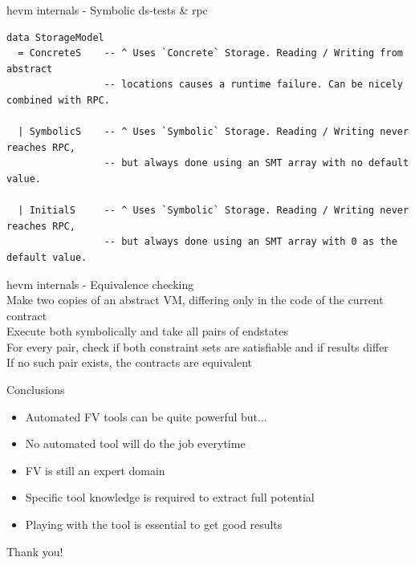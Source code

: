 \documentclass[aspectratio=169,10pt]{beamer}
\begin{document}
\begin{frame}[fragile]
\begin{center}
hevm internals - Symbolic ds-tests & rpc
\;\\
\begin{verbatim}
data StorageModel
  = ConcreteS    -- ^ Uses `Concrete` Storage. Reading / Writing from abstract
                 -- locations causes a runtime failure. Can be nicely combined with RPC.

  | SymbolicS    -- ^ Uses `Symbolic` Storage. Reading / Writing never reaches RPC,
                 -- but always done using an SMT array with no default value.

  | InitialS     -- ^ Uses `Symbolic` Storage. Reading / Writing never reaches RPC,
                 -- but always done using an SMT array with 0 as the default value.
\end{verbatim}
\end{center}
\end{frame}

\begin{frame}[fragile]
\begin{center}
hevm internals - Equivalence checking
\;\\
Make two copies of an abstract VM, differing only in the code of the current contract\\
Execute both symbolically and take all pairs of endstates\\
For every pair, check if both constraint sets are satisfiable and if results differ\\
If no such pair exists, the contracts are equivalent\\
\end{center}
\end{frame}

\begin{frame}[fragile]
\begin{center}
Conclusions
\begin{itemize}
\item Automated FV tools can be quite powerful but...
\item No automated tool will do the job everytime
\item FV is still an expert domain
\item Specific tool knowledge is required to extract full potential
\item Playing with the tool is essential to get good results
\end{itemize}
\end{center}
\end{frame}

\begin{frame}
\begin{center}
Thank you!
\end{center}
\end{frame}
 
\end{document}
